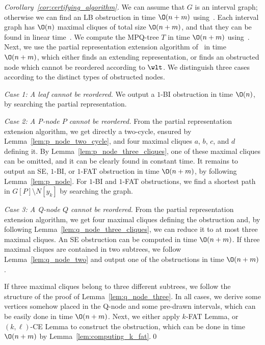 \begin{proof}[Corollary~\ref{cor:certifying_algorithm}]
We can assume that $G$ is an interval graph; otherwise we can find an LB obstruction in time
$\O(n+m)$ using~\cite{finding_lb_graphs}.  Each interval graph has $\O(n)$ maximal cliques of total
size $\O(n+m)$, and that they can be found in linear time~\cite{recog_chordal_graphs}.  We compute
the MPQ-tree $T$ in time $\O(n+m)$ using~\cite{korte_mohring}. Next, we use the partial
representation extension algorithm of~\cite{kkosv} in time $\O(n+m)$, which either finds an
extending representation, or finds an obstructed node which cannot be reordered according to $\wlt$.
We distinguish three cases according to the distinct types of obstructed nodes.

\emph{Case 1: A leaf cannot be reordered.}
We output a $1$-BI obstruction in time $\O(n)$, by searching the partial representation.

\emph{Case 2: A P-node $P$ cannot be reordered.}
From the partial representation extension algorithm, we get directly a two-cycle, ensured by
Lemma~\ref{lem:p_node_two_cycle}, and four maximal cliques $a$, $b$, $c$, and $d$ defining it. By
Lemma~\ref{lem:p_node_three_cliques}, one of these maximal cliques can be omitted, and
it can be clearly found in constant time. It remains to output an SE, $1$-BI, or $1$-FAT
obstruction in time $\O(n+m)$, by following Lemma~\ref{lem:p_node}. For $1$-BI and $1$-FAT
obstructions, we find a shortest path in $G[P] \setminus N[y_k]$ by searching the graph.

\emph{Case 3: A Q-node $Q$ cannot be reordered.}
From the partial representation extension algorithm, we get four maximal cliques defining the
obstruction and, by following Lemma~\ref{lem:q_node_three_cliques}, we can reduce it to at most three
maximal cliques. An SE obstruction can be computed in time $\O(n+m)$. If three maximal
cliques are contained in two subtrees, we follow Lemma~\ref{lem:q_node_two} and output one of the
obstructions in time $\O(n+m)$.

If three maximal cliques belong to three different subtrees, we follow the structure of the proof of
Lemma~\ref{lem:q_node_three}. In all cases, we derive some vertices somehow placed in the Q-node and
some pre-drawn intervals, which can be easily done in time $\O(n+m)$. Next, we either apply $k$-FAT
Lemma, or $(k,\ell)$-CE Lemma to construct the obstruction, which can be done in time $\O(n+m)$ by
Lemma~\ref{lem:computing_k_fat}.\qed
\end{proof}
